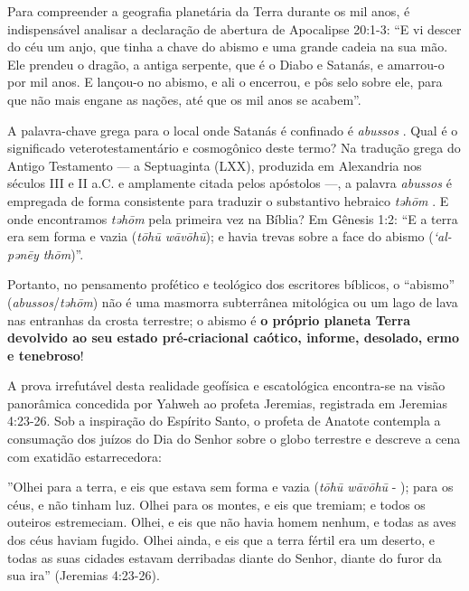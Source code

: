 Para compreender a geografia planetária da Terra durante os mil anos, é indispensável analisar a declaração de abertura de Apocalipse 20:1-3:
``E vi descer do céu um anjo, que tinha a chave do abismo e uma grande cadeia na sua mão. Ele prendeu o dragão, a antiga serpente, que é o Diabo e Satanás, e amarrou-o por mil anos. E lançou-o no abismo, e ali o encerrou, e pôs selo sobre ele, para que não mais engane as nações, até que os mil anos se acabem''.

A palavra-chave grega para o local onde Satanás é confinado é \textit{abussos} .
Qual é o significado veterotestamentário e cosmogônico deste termo?
Na tradução grega do Antigo Testamento — a Septuaginta (LXX), produzida em Alexandria nos séculos III e II a.C. e amplamente citada pelos apóstolos —, a palavra \textit{abussos} é empregada de forma consistente para traduzir o substantivo hebraico \textit{təhōm} .
E onde encontramos \textit{təhōm} pela primeira vez na Bíblia? Em Gênesis 1:2:
``E a terra era sem forma e vazia (\textit{tōhū wāvōhū}); e havia trevas sobre a face do abismo (\textit{‘al-pənēy thōm})''.

Portanto, no pensamento profético e teológico dos escritores bíblicos, o ``abismo'' (\textit{abussos}/\textit{təhōm}) não é uma masmorra subterrânea mitológica ou um lago de lava nas entranhas da crosta terrestre; o abismo é \textbf{o próprio planeta Terra devolvido ao seu estado pré-criacional caótico, informe, desolado, ermo e tenebroso}!

A prova irrefutável desta realidade geofísica e escatológica encontra-se na visão panorâmica concedida por Yahweh ao profeta Jeremias, registrada em Jeremias 4:23-26. Sob a inspiração do Espírito Santo, o profeta de Anatote contempla a consumação dos juízos do Dia do Senhor sobre o globo terrestre e descreve a cena com exatidão estarrecedora:

''Olhei para a terra, e eis que estava sem forma e vazia (\textit{tōhū wāvōhū} - ); para os céus, e não tinham luz.
Olhei para os montes, e eis que tremiam; e todos os outeiros estremeciam.
Olhei, e eis que não havia homem nenhum, e todas as aves dos céus haviam fugido.
Olhei ainda, e eis que a terra fértil era um deserto, e todas as suas cidades estavam derribadas diante do Senhor, diante do furor da sua ira'' (Jeremias 4:23-26).

